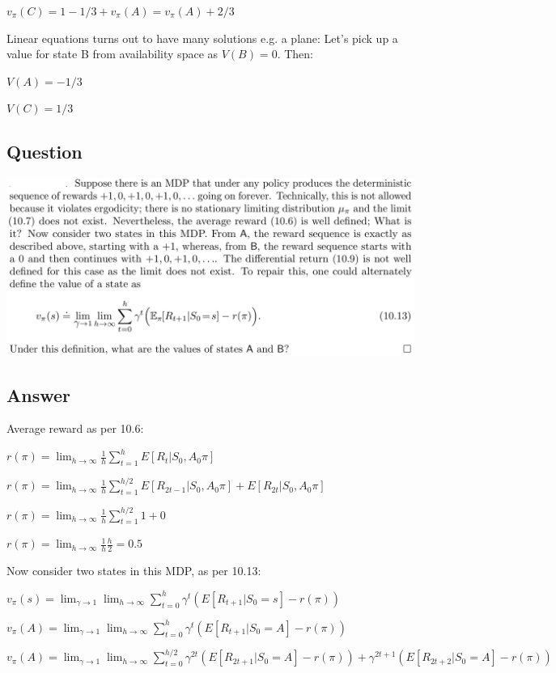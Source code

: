 \documentclass[11pt]{article}
\begin{document}
    $ v_\pi(C) =  1 - 1/3 + v_\pi(A) = v_\pi(A) + 2/3 $

    \noindent Linear equations turns out to have many solutions e.g. a plane:
    Let's pick up a value for state B from availability space as $V(B) = 0$.
    Then:

    $V(A) = -1/3$

    $V(C) = 1/3$

    \subsection{Question}

    \includegraphics[scale=0.9]{exercise_10_7q}

    \subsection*{Answer}

    \noindent Average reward as per 10.6:

    \noindent $ r(\pi) = \lim_{h \to \infty} \frac{1}{h} \sum_{t=1}^{h} E[R_t |S_0,A_0 \pi] $

    \noindent $ r(\pi) = \lim_{h \to \infty} \frac{1}{h} \sum_{t=1}^{h/2} E[R_{2t-1} |S_0,A_0 \pi] + E[R_{2t} |S_0,A_0 \pi] $

    \noindent $ r(\pi) = \lim_{h \to \infty} \frac{1}{h} \sum_{t=1}^{h/2} 1 + 0 $

    \noindent $ r(\pi) = \lim_{h \to \infty} \frac{1}{h} \frac{h}{2} = 0.5 $

    \noindent Now consider two states in this MDP, as per 10.13:

    \noindent $ v_\pi(s) = \lim_{\gamma \to 1} \lim_{h \to \infty} \sum_{t=0}^{h} \gamma^t (E[R_{t+1} |S_0=s] - r(\pi)) $

    \noindent $ v_\pi(A) = \lim_{\gamma \to 1} \lim_{h \to \infty} \sum_{t=0}^{h} \gamma^t (E[R_{t+1} |S_0=A] - r(\pi)) $

    \noindent $ v_\pi(A) = \lim_{\gamma \to 1} \lim_{h \to \infty} \sum_{t=0}^{h/2} \gamma^{2t} (E[R_{2t+1} |S_0=A] - r(\pi)) + \gamma^{2t+1} (E[R_{2t+2} |S_0=A] - r(\pi)) $
\end{document}
